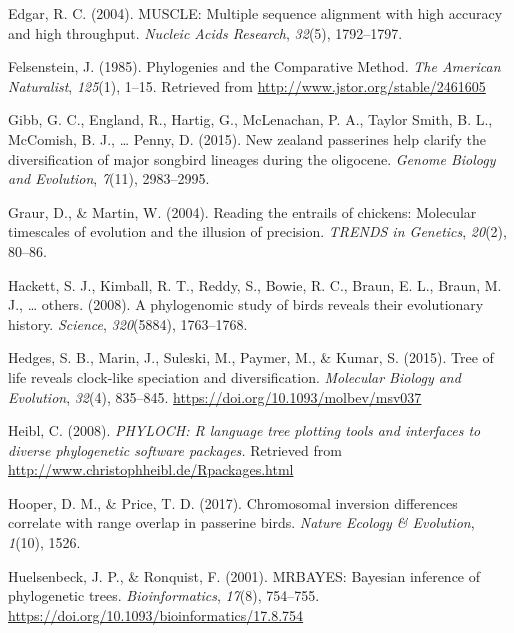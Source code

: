 \documentclass[
  english,
  man]{apa6}
\newlength{\cslhangindent}
\newlength{\cslentryspacingunit} %
\newenvironment{CSLReferences}[2] %
 {%
  \setlength{\parindent}{0pt}
  \ifodd #1
  \let\oldpar\par
  \def\par{\hangindent=\cslhangindent\oldpar}
  \fi
  \setlength{\parskip}{#2\cslentryspacingunit}
 }%
 {}
\begin{document}
\begin{CSLReferences}{1}{0}
\leavevmode{}%
Edgar, R. C. (2004). MUSCLE: Multiple sequence alignment with high accuracy and high throughput. \emph{Nucleic Acids Research}, \emph{32}(5), 1792--1797.

\leavevmode{}%
Felsenstein, J. (1985). {Phylogenies and the Comparative Method}. \emph{The American Naturalist}, \emph{125}(1), 1--15. Retrieved from \url{http://www.jstor.org/stable/2461605}

\leavevmode{}%
Gibb, G. C., England, R., Hartig, G., McLenachan, P. A., Taylor Smith, B. L., McComish, B. J., \ldots{} Penny, D. (2015). New zealand passerines help clarify the diversification of major songbird lineages during the oligocene. \emph{{Genome Biology and Evolution}}, \emph{7}(11), 2983--2995.

\leavevmode{}%
Graur, D., \& Martin, W. (2004). Reading the entrails of chickens: Molecular timescales of evolution and the illusion of precision. \emph{TRENDS in Genetics}, \emph{20}(2), 80--86.

\leavevmode{}%
Hackett, S. J., Kimball, R. T., Reddy, S., Bowie, R. C., Braun, E. L., Braun, M. J., \ldots{} others. (2008). A phylogenomic study of birds reveals their evolutionary history. \emph{Science}, \emph{320}(5884), 1763--1768.

\leavevmode{}%
Hedges, S. B., Marin, J., Suleski, M., Paymer, M., \& Kumar, S. (2015). {Tree of life reveals clock-like speciation and diversification}. \emph{{Molecular Biology and Evolution}}, \emph{32}(4), 835--845. \url{https://doi.org/10.1093/molbev/msv037}

\leavevmode{}%
Heibl, C. (2008). \emph{PHYLOCH: R language tree plotting tools and interfaces to diverse phylogenetic software packages.} Retrieved from \url{http://www.christophheibl.de/Rpackages.html}

\leavevmode{}%
Hooper, D. M., \& Price, T. D. (2017). Chromosomal inversion differences correlate with range overlap in passerine birds. \emph{Nature Ecology \& Evolution}, \emph{1}(10), 1526.

\leavevmode{}%
Huelsenbeck, J. P., \& Ronquist, F. (2001). {MRBAYES: Bayesian inference of phylogenetic trees}. \emph{Bioinformatics}, \emph{17}(8), 754--755. \url{https://doi.org/10.1093/bioinformatics/17.8.754}


\end{CSLReferences}
\end{document}
